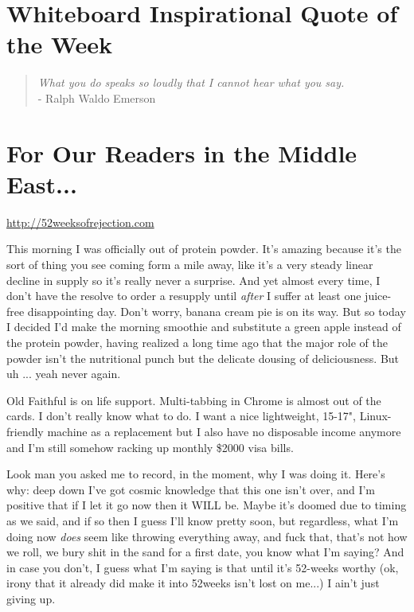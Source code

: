 \documentclass[12pt]{article}
\begin{document}
\newpage
\section*{Whiteboard Inspirational Quote of the Week}
\begin{quote}
\textit{What you do speaks so loudly that I cannot hear what you say.} \\- Ralph Waldo Emerson
\end{quote} 

\section*{For Our Readers in the Middle East...}
\url{http://52weeksofrejection.com}

This morning I was officially out of protein powder. It's amazing because it's the sort of thing you see coming form a mile away, like it's a very steady linear decline in supply so it's really never a surprise. And yet almost every time, I don't have the resolve to order a resupply until \textit{after} I suffer at least one juice-free disappointing day. Don't worry, banana cream pie is on its way. But so today I decided I'd make the morning smoothie and substitute a green apple instead of the protein powder, having realized a long time ago that the major role of the powder isn't the nutritional punch but the delicate dousing of deliciousness. But uh ... yeah never again.

Old Faithful is on life support. Multi-tabbing in Chrome is almost out of the cards. I don't really know what to do. I want a nice lightweight, 15-17", Linux-friendly machine as a replacement but I also have no disposable income anymore and I'm still somehow racking up monthly \$2000 visa bills. 

Look man you asked me to record, in the moment, why I was doing it. Here's why: deep down I've got cosmic knowledge that this one isn't over, and I'm positive that if I let it go now then it WILL be. Maybe it's doomed due to timing as we said, and if so then I guess I'll know pretty soon, but regardless, what I'm doing now \textit{does} seem like throwing everything away, and fuck that, that's not how we roll, we bury shit in the sand for a first date, you know what I'm saying? And in case you don't, I guess what I'm saying is that until it's 52-weeks worthy (ok, irony that it already did make it into 52weeks isn't lost on me...) I ain't just giving up.
\end{document}
